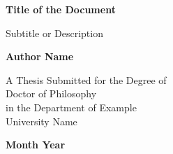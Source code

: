 
\begin{titlepage}
    \centering
    \vspace*{1in}

    \Huge
    \textbf{Title of the Document}

    \vspace{0.5in}

    \LARGE
    Subtitle or Description

    \vspace{1.5in}

    \textbf{Author Name}

    \vfill

    A Thesis Submitted for the Degree of\\ Doctor of Philosophy\\ in the Department
    of Example\\ University Name

    \vspace{0.8in}

    \textbf{Month Year}

\end{titlepage}


\documentclass{article}
\usepackage{fancyhdr}

\pagestyle{fancy}
\fancyhf{} %


\fancyfoot[C]{\thepage} %





\section{Introduction}
This document demonstrates different page number styles.


